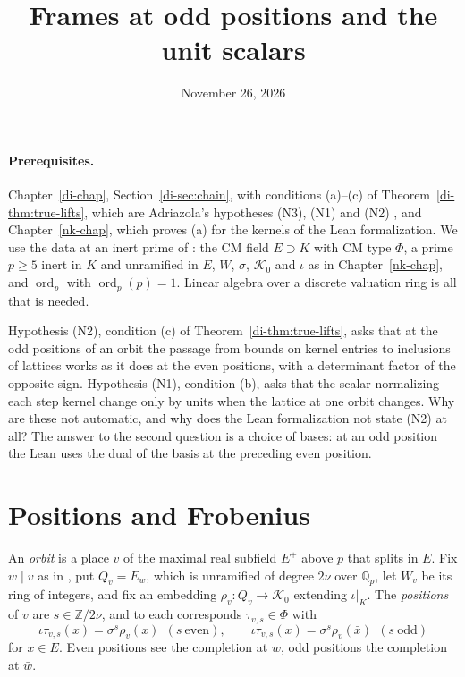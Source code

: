 \documentclass[reqno]{amsart}
\title{Frames at odd positions and the unit scalars}
\author{}
\date{November 26, 2026}
\newcounter{chap}
\theoremstyle{definition}
\theoremstyle{plain}
\theoremstyle{remark}
\newcommand{\Z}{\mathbb Z}
\newcommand{\Q}{\mathbb Q}
\newcommand{\Kc}{\mathcal K}
\newcommand{\ord}{\operatorname{ord}}
\begin{document}
\maketitle
{}\label{chap}

\paragraph{Prerequisites.}
Chapter~\ref{di-chap}, Section~\ref{di-sec:chain}, with conditions (a)--(c) of Theorem~\ref{di-thm:true-lifts}, which are Adriazola's hypotheses (N3), (N1) and (N2) \cite[Hyps.~11.42, 11.22 and~11.38]{Adr}, and Chapter~\ref{nk-chap}, which proves (a) for the kernels of the Lean formalization.  We use the data at an inert prime of \cite[\S11.1]{Adr}: the CM field \(E\supset K\) with CM type \(\Phi\), a prime \(p\ge5\) inert in \(K\) and unramified in \(E\), \(W\), \(\sigma\), \(\Kc_0\) and \(\iota\) as in Chapter~\ref{nk-chap}, and \(\ord_p\) with \(\ord_p(p)=1\).  Linear algebra over a discrete valuation ring is all that is needed.

Hypothesis (N2), condition (c) of Theorem~\ref{di-thm:true-lifts}, asks that at the odd positions of an orbit the passage from bounds on kernel entries to inclusions of lattices works as it does at the even positions, with a determinant factor of the opposite sign.  Hypothesis (N1), condition (b), asks that the scalar normalizing each step kernel change only by units when the lattice at one orbit changes.  Why are these not automatic, and why does the Lean formalization \cite{Lean} not state (N2) at all?  The answer to the second question is a choice of bases: at an odd position the Lean uses the dual of the basis at the preceding even position.

\section{Positions and Frobenius}\label{sec:positions}
An \emph{orbit} is a place \(v\) of the maximal real subfield \(E^+\) above \(p\) that splits in \(E\).  Fix \(w\mid v\) as in \cite[\S11.1]{Adr}, put \(Q_v=E_w\), which is unramified of degree \(2\nu\) over \(\Q_p\), let \(W_v\) be its ring of integers, and fix an embedding \(\rho_v\colon Q_v\to\Kc_0\) extending \(\iota|_K\).  The \emph{positions} of \(v\) are \(s\in\Z/2\nu\), and to each corresponds \(\tau_{v,s}\in\Phi\) with
\[
 \iota\tau_{v,s}(x)=\sigma^s\rho_v(x)\ \ (s\ \text{even}),\qquad
 \iota\tau_{v,s}(x)=\sigma^s\rho_v(\bar x)\ \ (s\ \text{odd})
\]
for \(x\in E\).  Even positions see the completion at \(w\), odd positions the completion at \(\bar w\).
\end{document}
